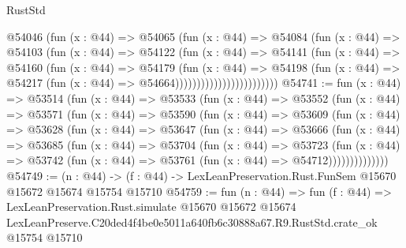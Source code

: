 \begin{lexlean}{RustStd}
\begin{coremodule}
                              @54046
                                (fun (x : @44) =>
                                @54065
                                  (fun (x : @44) =>
                                  @54084
                                    (fun (x : @44) =>
                                    @54103
                                      (fun (x : @44) =>
                                      @54122
                                        (fun (x : @44) =>
                                        @54141
                                          (fun (x : @44) =>
                                          @54160
                                            (fun (x : @44) =>
                                            @54179
                                              (fun (x : @44) =>
                                              @54198
                                                (fun (x : @44) =>
                                                @54217
                                                  (fun (x : @44) => @54664))))))))))))))))))))))))
@54741 := fun (x : @44) =>
  @53514
    (fun (x : @44) =>
    @53533
      (fun (x : @44) =>
      @53552
        (fun (x : @44) =>
        @53571
          (fun (x : @44) =>
          @53590
            (fun (x : @44) =>
            @53609
              (fun (x : @44) =>
              @53628
                (fun (x : @44) =>
                @53647
                  (fun (x : @44) =>
                  @53666
                    (fun (x : @44) =>
                    @53685
                      (fun (x : @44) =>
                      @53704
                        (fun (x : @44) =>
                        @53723
                          (fun (x : @44) =>
                          @53742 (fun (x : @44) => @53761 (fun (x : @44) => @54712))))))))))))))
@54749 := (n : @44) ->
  (f : @44) -> LexLeanPreservation.Rust.FunSem @15670 @15672 @15674 @15754 @15710
@54759 := fun (n : @44) =>
  fun (f : @44) =>
  LexLeanPreservation.Rust.simulate
    @15670
    @15672
    @15674
    LexLeanPreserve.C20ded4f4be0e5011a640fb6c30888a67.R9.RustStd.crate_ok
    @15754
    @15710
\end{coremodule}
\end{lexlean}
